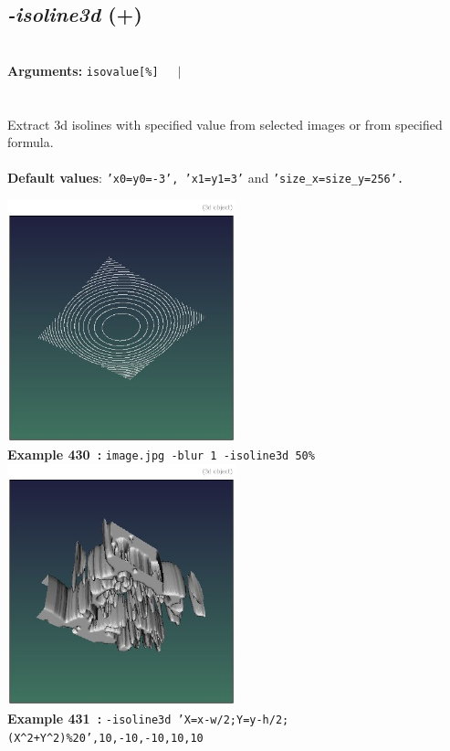 \documentclass[a4paper,11pt,twoside]{book}
\begin{document}
\subsection{\emph{-isoline3d} (+)}\vspace*{-0.5em}
~\\\textbf{Arguments: } 
{\small \texttt{isovalue[\%]}}~~~$|$\\
\\~\\
Extract 3d isolines with specified value from selected images or from specified formula.
~\\~\\\textbf{Default values}: {\small \texttt{'x0=y0=-3', 'x1=y1=3'} and \texttt{'size\_x=size\_y=256'.}}
\begin{center}\includegraphics[keepaspectratio=true,height=7cm,width=\textwidth]{img/gmic_def430.jpg}\\
{\footnotesize \textbf{Example 430~:} \texttt{image.jpg -blur 1 -isoline3d 50\%}}
\\\includegraphics[keepaspectratio=true,height=7cm,width=\textwidth]{img/gmic_def431.jpg}\\
{\footnotesize \textbf{Example 431~:} \texttt{-isoline3d 'X=x-w/2;Y=y-h/2;(X\textasciicircum 2+Y\textasciicircum 2)\%20',10,-10,-10,10,10}}
\end{center}
\end{document}
